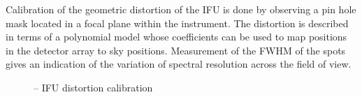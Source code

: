 Calibration of the geometric distortion of the IFU is done by
observing a pin hole mask located in a focal plane within the
instrument. The distortion is described in terms of a polynomial model
whose coefficients can be used to map positions in the detector
array to sky positions. Measurement of the FWHM of the spots gives an
indication of the variation of spectral resolution across the field of view.



\begin{figure}[hb]
  \centering
    \def \globalscale {0.700000}
    \fontsize{10}{12}\selectfont
    
  \caption[Recipe: ]{%
     -- IFU distortion calibration}
  \label{fig:metis_ifu_distortion}
\end{figure}


\clearpage




